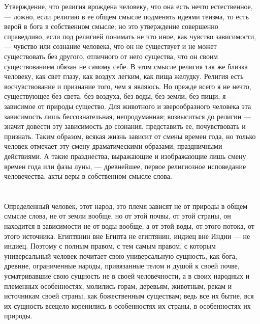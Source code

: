 \documentclass[12pt]{article}
\begin{document}
Утверждение, что религия врождена человеку, что она есть нечто естественное, --- ложно, если религию в ее общем смысле подменять идеями теизма, то есть верой в бога в собственном смысле; но это утверждение совершенно справедливо, если под религией понимать не что иное, как чувство зависимости, --- чувство или сознание человека, что он не существует и не может существовать без другого, отличного от него существа, что он своим существованием обязан не самому себе. В этом смысле религия так же близка человеку, как свет глазу, как воздух легким, как пища желудку. Религия есть восчувствование и признание того, чем я являюсь. Но прежде всего я не нечто, существующее без света, без воздуха, без воды, без земли, без пищи, я --- зависимое от природы существо. Для животного и зверообразного человека эта зависимость лишь бессознательная, непродуманная; возвыситься до религии --- значит довести эту зависимость до сознания, представить ее, почувствовать и признать. Таким образом, всякая жизнь зависит от смены времен года, но только человек отмечает эту смену драматическими образами, праздничными действиями. А такие празднества, выражающие и изображающие лишь смену времен года или фазы луны, --- древнейшее, первое религиозное исповедание человечества, акты веры в собственном смысле слова.



\section{}

Определенный человек, этот народ, это племя зависят не от природы в общем смысле слова, не от земли вообще, но от этой почвы, от этой страны, он находится в зависимости не от воды вообще, а от этой воды, от этого потока, от этого источника. Египтянин вне Египта не египтянин, индиец вне Индии --- не индиец. Поэтому с полным правом, с тем самым правом, с которым универсальный человек почитает свою универсальную сущность, как бога, древние, ограниченные народы, привязанные телом и душой к своей почве, усматривавшие свою сущность не в своей человечности, а в своих народных и племенных особенностях, молились горам, деревьям, животным, рекам и источникам своей страны, как божественным существам; ведь все их бытие, вся их сущность всецело коренились в особенностях их страны, в особенностях их природы.



\section{}
\end{document}
